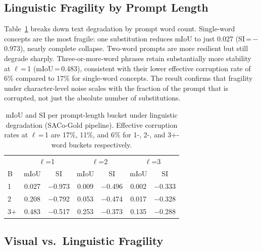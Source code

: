 \documentclass[10pt,twocolumn,letterpaper]{article}
\begin{document}
\subsection{Linguistic Fragility by Prompt Length}
\label{sec:results-text-length}

Table~\ref{tab:prompt-length-si} breaks down text degradation by prompt
word count.  Single-word concepts are the most fragile: one substitution
reduces mIoU to just 0.027 (SI\,=\,$-$0.973), nearly complete collapse.
Two-word prompts are more resilient but still degrade sharply.
Three-or-more-word phrases retain substantially more stability at $\ell$\,=\,1
(mIoU\,=\,0.483), consistent with their lower effective corruption rate
of 6\% compared to 17\% for single-word concepts.  The result confirms
that fragility under character-level noise scales with the fraction of the prompt that is corrupted, not just the absolute number of substitutions.

\begin{table}[h]
\centering
\small
\begin{tabular}{lcccccc}
\hline
& \multicolumn{2}{c}{$\ell$=1} & \multicolumn{2}{c}{$\ell$=2} & \multicolumn{2}{c}{$\ell$=3} \\
B & mIoU & SI & mIoU & SI & mIoU & SI \\
\hline
1   & 0.027 & $-$0.973 & 0.009 & $-$0.496 & 0.002 & $-$0.333 \\
2   & 0.208 & $-$0.792 & 0.053 & $-$0.474 & 0.017 & $-$0.328 \\
3+  & 0.483 & $-$0.517 & 0.253 & $-$0.373 & 0.135 & $-$0.288 \\
\hline
\end{tabular}
\vspace{3pt}
\caption{mIoU and SI per prompt-length bucket under linguistic degradation (SACo-Gold pipeline).  Effective corruption rates at $\ell$\,=\,1 are 17\%, 11\%, and 6\% for 1-, 2-, and
         3+-word buckets respectively.}
\label{tab:prompt-length-si}
\end{table}

\subsection{Visual vs.\ Linguistic Fragility}
\label{sec:results-crossmodal}
\end{document}
